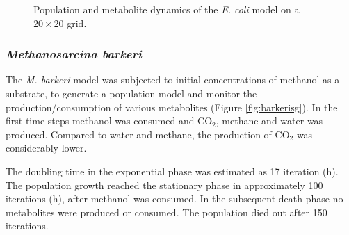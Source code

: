 \begin{figure}[h!]
{\begin{minipage}[t]{0.3\textwidth}
  \end{minipage}
  }
  \caption{Population and metabolite dynamics of the \emph{E. coli} model on a $20\times20$ grid.}
  \label{fig:ecoligrids}
\end{figure}

\subsubsection{\textit{Methanosarcina barkeri}}
The \textit{M. barkeri} model was subjected to initial concentrations of methanol as a substrate, to generate a population model and monitor the production/consumption of various metabolites (Figure \hyperref[fig:barkerisg]{\ref{fig:barkerisg}}). In the first time steps methanol was consumed and CO$_2$, methane and water was produced. Compared to water and methane, the production of CO$_2$ was considerably lower.

The doubling time in the exponential phase was estimated as 17 iteration (h).
The population growth reached the stationary phase in approximately 100 iterations (h), after methanol was consumed. In the subsequent death phase no metabolites were produced or consumed. The population died out after 150 iterations.

